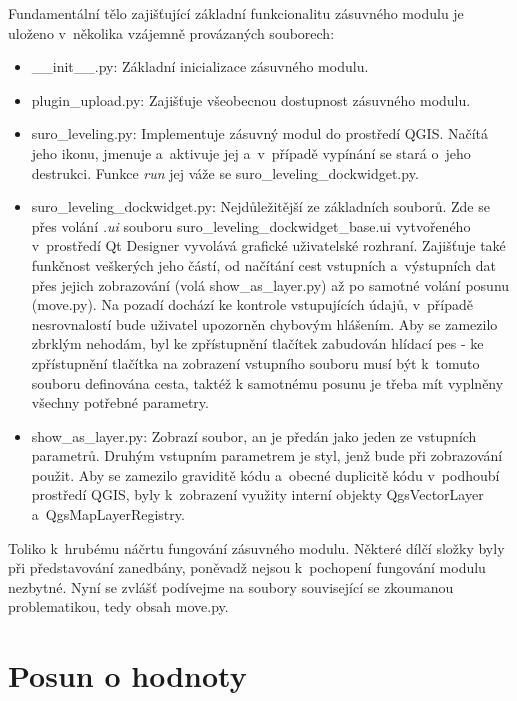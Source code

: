 Fundamentální tělo zajišťující základní funkcionalitu zásuvného modulu je ulože\-no v~několika vzájemně
provázaných souborech: 
\begin{itemize}

	\item \_\_init\_\_.py: Základní inicializace zásuvného modulu. 

	\item plugin\_upload.py: Zajišťuje všeobecnou dostupnost zásuvného modulu. 	

	\item suro\_leveling.py: Implementuje zásuvný modul do prostředí QGIS. Načítá jeho ikonu,
	jmenuje a~aktivuje jej a~v~případě vypínání se stará o~jeho destrukci. Funkce \textit{run} jej váže se
	suro\_leveling\_dockwidget.py. 
	
	\item suro\_leveling\_dockwidget.py: Nejdůležitější ze základních souborů. Zde se přes volání
	\textit{.ui} souboru suro\_leveling\_dockwidget\_base.ui vytvořeného v~prostředí Qt Designer
	vyvolává grafické uživatelské rozhraní. Zajišťuje také funkčnost ve\-škerých jeho částí, od načítání
	cest vstupních a~výstupních dat přes jejich zobrazování (volá show\_as\_layer.py) až po samotné volání
	posunu (move.py). Na pozadí dochází ke kontrole vstupujících údajů, v~případě nesrovnalostí
	bude uživatel upozorněn chybovým hlášením. Aby se zamezilo zbrklým nehodám, byl ke zpřístupnění
	tlačítek zabudován hlídací pes - ke zpřístupnění tlačítka na zobrazení vstupního souboru musí být
	k~tomuto souboru definována cesta, taktéž k samotnému posunu je třeba mít vyplněny všechny potřebné
	parametry. 
	
	\item show\_as\_layer.py: Zobrazí soubor, an je předán jako jeden ze vstupních parame\-trů. Druhým
	vstupním parametrem je styl, jenž bude při zobrazování použit. Aby se zamezilo graviditě kódu
	a~obecné duplicitě kódu v~podhoubí prostředí QGIS, byly k~zobrazení využity interní objekty
	QgsVectorLayer a~QgsMapLayerRegistry. 

\end{itemize}

Toliko k~hrubému náčrtu fungování zásuvného modulu. Některé dílčí složky byly při představování
zane\-dbány, poněvadž nejsou k~pochopení fungování mo\-dulu nezbytné. Nyní se zvlášť podívejme na
soubory související se zkoumanou pro\-blematikou, tedy obsah move.py. 

\section{Posun o hodnoty}
\label{by_points}

